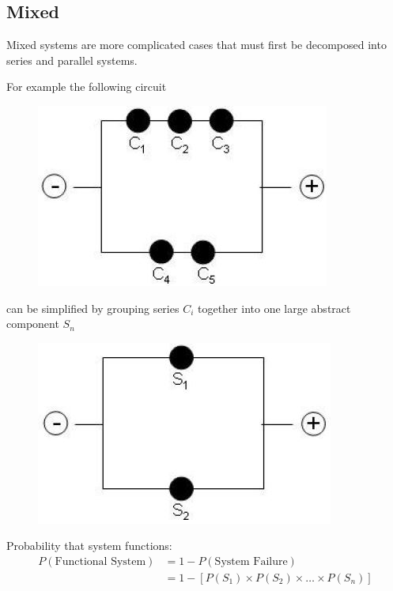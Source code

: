 \documentclass[10pt,a4paper]{article}
\begin{document}
\pagebreak
\subsection{Mixed}

Mixed systems are more complicated cases that must first be decomposed into series and parallel
systems.

For example the following circuit \par
\begin{figure}[h]
    \centering
    \includegraphics[scale=0.5]{mixed_circuit.JPG}
\end{figure}
can be simplified by grouping series $C_i$ together into one large abstract component
$S_n$ 

\begin{figure} [h!]
    \centering
    \includegraphics[scale=0.5]{mixed_circuit2.JPG}
\end{figure}

Probability that system functions:
\begin{align*}
    P(\text{Functional System}) &= 1 - P(\text{System Failure}) \\
    &= 1 - [P(S_1)\times P(S_2)\times \dots\times P(S_n)]
\end{align*}
\end{document}
